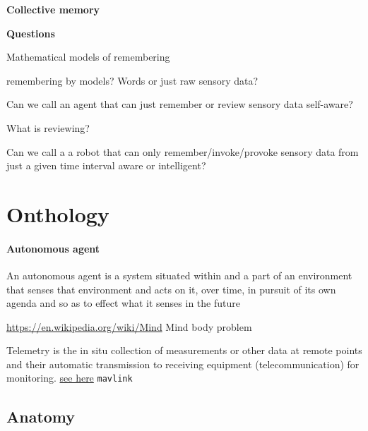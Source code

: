 \documentclass{book}
\newcommand{\seehere}[1]{\href{#1}{see here}}
\providecommand{\ProjectDeepHeading}[2]{%
    \par\medskip\noindent\textbf{#2}\par\smallskip
}
\providecommand{\seehere}[1]{\href{#1}{see here}}
\providecommand{\semtag}[1]{\texttt{#1}}
\begin{document}
\ProjectDeepHeading{5}{Collective memory}



\ProjectDeepHeading{5}{Questions}
Mathematical models of remembering

remembering by models? Words or just raw sensory data?

Can we call an agent that can just remember or review sensory data self-aware?

What is reviewing?

Can we call a a robot that can only remember/invoke/provoke sensory data from just a given time interval aware or intelligent?

\chapter{Onthology}


\cite{goncalves-etal-2023-ieee-autonomous-robotics-ontology}


\subsubsection{Autonomous agent}
        An autonomous agent is a system situated within and a part of an environment that senses that environment and acts on it, over time, in pursuit of its own agenda and so as to effect what it senses in the future
        \cite{franklin-1997-is-it-an-agent-or-just-a-program-a-taxonomy-for-autonomous-agents}


\url{https://en.wikipedia.org/wiki/Mind}
    Mind body problem


Telemetry is the in situ collection of measurements or other data at remote points and their automatic transmission to receiving equipment (telecommunication) for monitoring.
    \seehere{https://en.wikipedia.org/wiki/Telemetry}
    \semtag{mavlink}

\section{Anatomy}

\end{document}
